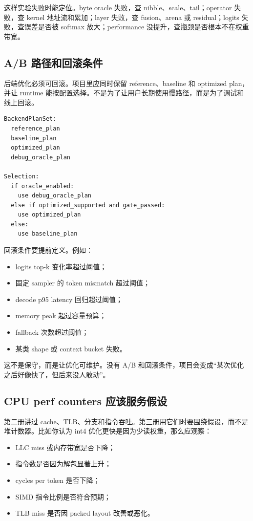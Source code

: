 这样实验失败时能定位。byte oracle 失败，查 nibble、scale、tail；operator 失败，查 kernel 地址流和累加；layer 失败，查 fusion、arena 或 residual；logits 失败，查误差是否被 softmax 放大；performance 没提升，查瓶颈是否根本不在权重带宽。

\subsection{A/B 路径和回滚条件}

后端优化必须可回滚。项目里应同时保留 reference、baseline 和 optimized plan，并让 runtime 能按配置选择。不是为了让用户长期使用慢路径，而是为了调试和线上回滚。

\begin{lstlisting}[numbers=none,caption={后端 plan 选择策略}]
BackendPlanSet:
  reference_plan
  baseline_plan
  optimized_plan
  debug_oracle_plan

Selection:
  if oracle_enabled:
    use debug_oracle_plan
  else if optimized_supported and gate_passed:
    use optimized_plan
  else:
    use baseline_plan
\end{lstlisting}

回滚条件要提前定义。例如：

\begin{itemize}
  \item logits top-k 变化率超过阈值；
  \item 固定 sampler 的 token mismatch 超过阈值；
  \item decode p95 latency 回归超过阈值；
  \item memory peak 超过容量预算；
  \item fallback 次数超过阈值；
  \item 某类 shape 或 context bucket 失败。
\end{itemize}

这不是保守，而是让优化可维护。没有 A/B 和回滚条件，项目会变成“某次优化之后好像快了，但后来没人敢动”。

\subsection{CPU perf counters 应该服务假设}

第二册讲过 cache、TLB、分支和指令吞吐。第三册用它们时要围绕假设，而不是堆计数器。比如你认为 int4 优化更快是因为少读权重，那么应观察：

\begin{itemize}
  \item LLC miss 或内存带宽是否下降；
  \item 指令数是否因为解包显著上升；
  \item cycles per token 是否下降；
  \item SIMD 指令比例是否符合预期；
  \item TLB miss 是否因 packed layout 改善或恶化。
\end{itemize}

